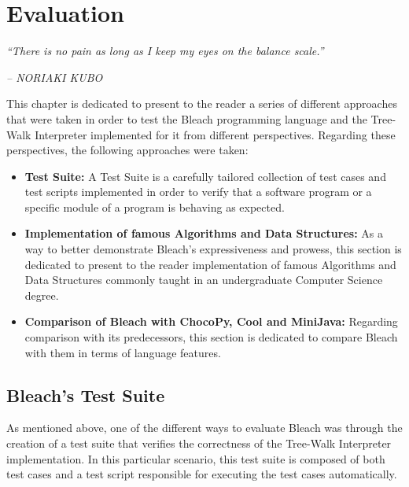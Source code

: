 \chapter{Evaluation} \label{cap:Resultados}

\begin{displayquote}
    \begin{center}
        \textit{``There is no pain as long as I keep my eyes on the balance scale.''}
    \end{center}
\end{displayquote}

\begin{flushright}
   \textit{-- NORIAKI KUBO}
\end{flushright}

This chapter is dedicated to present to the reader a series of different approaches that were taken in order to test the Bleach programming language and the Tree-Walk Interpreter implemented for it from different perspectives. Regarding these perspectives, the following approaches were taken:
\begin{itemize}
    \item \textbf{Test Suite:} A Test Suite is a carefully tailored collection of test cases and test scripts implemented in order to verify that a software program or a specific module of a program is behaving as expected.
    
    \item \textbf{Implementation of famous Algorithms and Data Structures:} As a way to better demonstrate Bleach's expressiveness and prowess, this section is dedicated to present to the reader implementation of famous Algorithms and Data Structures commonly taught in an undergraduate Computer Science degree.
    
    \item \textbf{Comparison of Bleach with ChocoPy, Cool and MiniJava:} Regarding comparison with its predecessors, this section is dedicated to compare Bleach with them in terms of language features.
\end{itemize}


\section{Bleach's Test Suite}
As mentioned above, one of the different ways to evaluate Bleach was through the creation of a test suite that verifies the correctness of the Tree-Walk Interpreter implementation. In this particular scenario, this test suite is composed of both test cases and a test script responsible for executing the test cases automatically.

